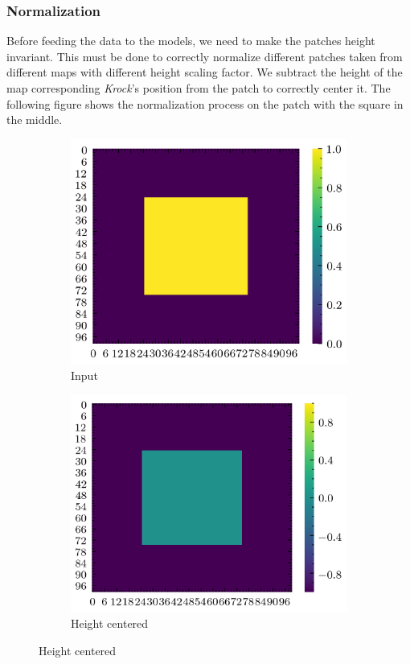 \documentclass[../document.tex]{subfiles}
\begin{document}
\subsubsection{Normalization}
Before feeding the data to the models, we need to make the patches height invariant. This must be done to correctly normalize different patches taken from different maps with different height scaling factor. We subtract the height of the map corresponding \emph{Krock}'s position from the patch to correctly center it. The following figure shows the normalization process on the patch with the square in the middle.
\begin{figure}[H]
    \begin{subfigure}[b]{0.5\textwidth}
        \includegraphics[width=\textwidth]{../img/data-aug/2d/square-middle.png}
        \caption{Input}
    \end{subfigure}
    \begin{subfigure}[b]{0.5\textwidth}
        \includegraphics[width=\textwidth]{../img/data-aug/2d/square-middle-center.png}
        \caption{Height centered}
    \end{subfigure}  
    

\end{figure}
\end{document}
